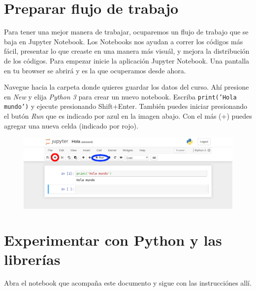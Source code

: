 \documentclass[a4paper,11pt]{article}
\begin{document}
\section{Preparar flujo de trabajo}
Para tener una mejor manera de trabajar, ocuparemos un flujo de trabajo que se baja en Jupyter Notebook. Los Notebooks nos ayudan a correr los códigos más fácil, presentar lo que creaste en una manera más visuál, y mejora la distribución de los códigos. Para empezar inicie la aplicación Jupyter Notebook. Una pantalla en tu browser se abrirá y es la que ocuperamos desde ahora.

Navegue hacia la carpeta donde quieres guardar los datos del curso. Ahí presione en \emph{New} y elija \emph{Python 3} para crear un nuevo notebook. Escriba \texttt{print('Hola mundo')} y ejecute presionando Shift+Enter. También puedes iniciar presionando el butón \emph{Run} que es indicado por azul en la imagen abajo. Con el más (+) puedes agregar una nueva celda (indicado por rojo).

\begin{figure}[ht]
\centering
\includegraphics[scale=1.75]{jupyter.png}
\end{figure}

\section{Experimentar con Python y las librerías}
Abra el notebook que acompaña este documento y sigue con las instrucciónes allí.

\end{document}
